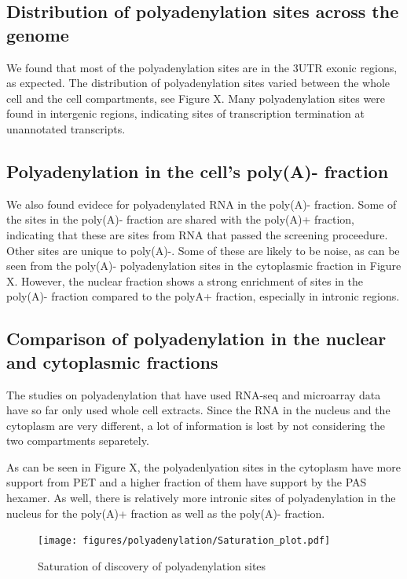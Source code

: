 \subsection{Distribution of polyadenylation sites across the genome}
We found that most of the polyadenylation sites are in the 3\p UTR exonic
regions, as expected. The distribution of polyadenylation sites varied between
the whole cell and the cell compartments, see Figure X. Many polyadenylation
sites were found in intergenic regions, indicating sites of transcription
termination at unannotated transcripts.

\subsection{Polyadenylation in the cell's poly(A)- fraction}
We also found evidece for polyadenylated RNA in the poly(A)- fraction. Some of
the sites in the poly(A)- fraction are shared with the poly(A)+ fraction,
indicating that these are sites from RNA that passed the screening proceedure.
Other sites are unique to poly(A)-. Some of these are likely to be noise, as
can be seen from the poly(A)- polyadenylation sites in the cytoplasmic fraction
in Figure X. However, the nuclear fraction shows a strong enrichment of sites
in the poly(A)- fraction compared to the polyA+ fraction, especially in 
intronic regions.

\subsection{Comparison of polyadenylation in the nuclear and cytoplasmic
fractions}
The studies on polyadenylation that have used RNA-seq and microarray
data have so far only used whole cell extracts. Since the RNA in the nucleus
and the cytoplasm are very different, a lot of information is lost by not
considering the two compartments separetely. 

As can be seen in Figure X, the polyadenlyation sites in the cytoplasm have
more support from PET and a higher fraction of them have support by the PAS
hexamer. As well, there is relatively more intronic sites of polyadenylation in
the nucleus for the poly(A)+ fraction as well as the poly(A)- fraction.

\begin{figure}[htb]
	\begin{center}
		\texttt{[image: figures/polyadenylation/Saturation\_plot.pdf]}
	\end{center}
	\caption{Saturation of discovery of polyadenylation sites}
	\label{fig:saturation}
\end{figure}

